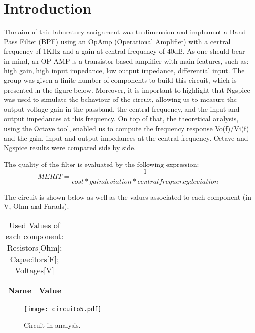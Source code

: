 \section{Introduction}
\label{introduction}


\par The aim of this laboratory assignment was to dimension and implement a Band Pass Filter (BPF) using an OpAmp (Operational Amplifier) with a central frequency of 1KHz and a gain at central frequency of 40dB. As one should bear in mind, an OP-AMP is a transistor-based amplifier with main features, such as: high gain, high input impedance, low output impedance, differential input. The group was given a finite number of components to build this circuit, which is presented in the figure below. Moreover, it is important to highlight that Ngspice was used to simulate the behaviour of the circuit, allowing us to measure the output voltage gain in the passband, the central frequency, and the input and output impedances at this frequency. On top of that, the theoretical analysis, using the Octave tool, enabled us to compute the frequency response Vo(f)/Vi(f) and the gain, input and output impedances at the central frequency. Octave and Ngspice results were compared side by side.

\par The quality of the filter is evaluated by the following expression:
\begin {equation}
	 MERIT = \frac{1}{cost * gain deviation * central frequency deviation}   	
	\label{merit}
\end{equation}

The circuit is shown below as well as the values associated to each component (in V, Ohm and Farads).


\begin{table}[ht]
  \centering
  \begin{tabular}{|l|r|}
    \hline    
    {\bf Name} & {\bf Value} \\ \hline
    
  \end{tabular}
  \caption{Used Values of each component: Resistors[Ohm]; Capacitors[F]; Voltages[V]}
  \label{tab:3}
\end{table}



\begin{figure}[ht] \centering
\texttt{[image: circuito5.pdf]}
\caption{Circuit in analysis.}
\label{circuito todo}
\end{figure}




\newpage


